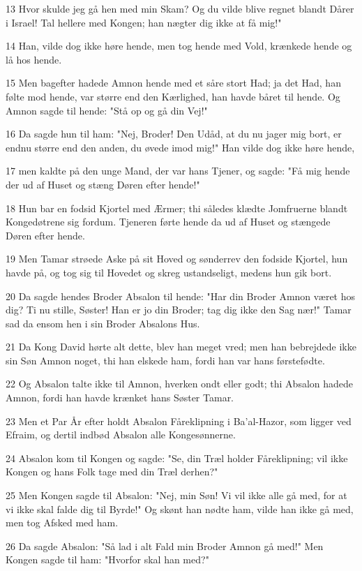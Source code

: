 \par 13 Hvor skulde jeg gå hen med min Skam? Og du vilde blive regnet blandt Dårer i Israel! Tal hellere med Kongen; han nægter dig ikke at få mig!"
\par 14 Han, vilde dog ikke høre hende, men tog hende med Vold, krænkede hende og lå hos hende.
\par 15 Men bagefter hadede Amnon hende med et såre stort Had; ja det Had, han følte mod hende, var større end den Kærlighed, han havde båret til hende. Og Amnon sagde til hende: "Stå op og gå din Vej!"
\par 16 Da sagde hun til ham: "Nej, Broder! Den Udåd, at du nu jager mig bort, er endnu større end den anden, du øvede imod mig!" Han vilde dog ikke høre hende,
\par 17 men kaldte på den unge Mand, der var hans Tjener, og sagde: "Få mig hende der ud af Huset og stæng Døren efter hende!"
\par 18 Hun bar en fodsid Kjortel med Ærmer; thi således klædte Jomfruerne blandt Kongedøtrene sig fordum. Tjeneren førte hende da ud af Huset og stængede Døren efter hende.
\par 19 Men Tamar strøede Aske på sit Hoved og sønderrev den fodside Kjortel, hun havde på, og tog sig til Hovedet og skreg ustandseligt, medens hun gik bort.
\par 20 Da sagde hendes Broder Absalon til hende: "Har din Broder Amnon været hos dig? Ti nu stille, Søster! Han er jo din Broder; tag dig ikke den Sag nær!" Tamar sad da ensom hen i sin Broder Absalons Hus.
\par 21 Da Kong David hørte alt dette, blev han meget vred; men han bebrejdede ikke sin Søn Amnon noget, thi han elskede ham, fordi han var hans førstefødte.
\par 22 Og Absalon talte ikke til Amnon, hverken ondt eller godt; thi Absalon hadede Amnon, fordi han havde krænket hans Søster Tamar.
\par 23 Men et Par År efter holdt Absalon Fåreklipning i Ba'al-Hazor, som ligger ved Efraim, og dertil indbød Absalon alle Kongesønnerne.
\par 24 Absalon kom til Kongen og sagde: "Se, din Træl holder Fåreklipning; vil ikke Kongen og hans Folk tage med din Træl derhen?"
\par 25 Men Kongen sagde til Absalon: "Nej, min Søn! Vi vil ikke alle gå med, for at vi ikke skal falde dig til Byrde!" Og skønt han nødte ham, vilde han ikke gå med, men tog Afsked med ham.
\par 26 Da sagde Absalon: "Så lad i alt Fald min Broder Amnon gå med!" Men Kongen sagde til ham: "Hvorfor skal han med?"
